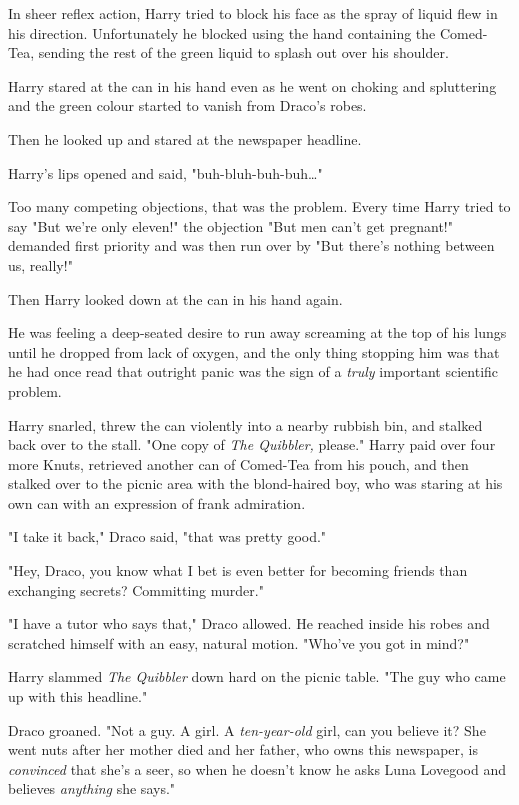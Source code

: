 In sheer reflex action, Harry tried to block his face as the spray of liquid 
flew in his direction. Unfortunately he blocked using the hand containing the 
Comed-Tea, sending the rest of the green liquid to splash out over his shoulder.

Harry stared at the can in his hand even as he went on choking and spluttering 
and the green colour started to vanish from Draco's robes.

Then he looked up and stared at the newspaper headline.


Harry's lips opened and said, "buh-bluh-buh-buh{\ldots}"

Too many competing objections, that was the problem. Every time Harry tried to 
say "But we're only eleven!" the objection "But men can't get pregnant!" 
demanded first priority and was then run over by "But there's nothing between 
us, really!"

Then Harry looked down at the can in his hand again.

He was feeling a deep-seated desire to run away screaming at the top of his 
lungs until he dropped from lack of oxygen, and the only thing stopping him was 
that he had once read that outright panic was the sign of a \emph{truly} 
important scientific problem.

Harry snarled, threw the can violently into a nearby rubbish bin, and stalked 
back over to the stall. "One copy of \emph{The Quibbler,} please." Harry paid 
over four more Knuts, retrieved another can of Comed-Tea from his pouch, and 
then stalked over to the picnic area with the blond-haired boy, who was staring 
at his own can with an expression of frank admiration.

"I take it back," Draco said, "that was pretty good."

"Hey, Draco, you know what I bet is even better for becoming friends than 
exchanging secrets? Committing murder."

"I have a tutor who says that," Draco allowed. He reached inside his robes and 
scratched himself with an easy, natural motion. "Who've you got in mind?"

Harry slammed \emph{The Quibbler} down hard on the picnic table. "The guy who 
came up with this headline."

Draco groaned. "Not a guy. A girl. A \emph{ten-year-old} girl, can you believe 
it? She went nuts after her mother died and her father, who owns this 
newspaper, is \emph{convinced} that she's a seer, so when he doesn't know he 
asks Luna Lovegood and believes \emph{anything} she says."

